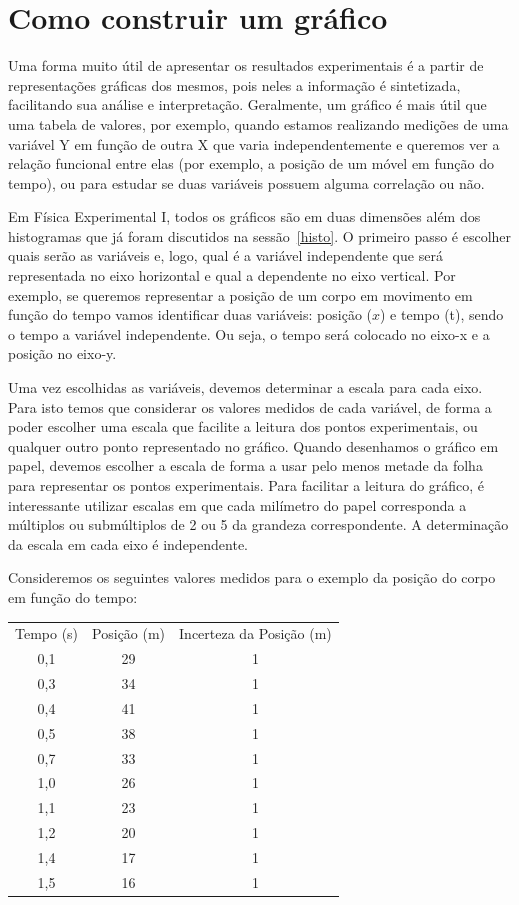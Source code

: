 \section{Como construir um gráfico}\label{plot}

Uma forma muito útil de apresentar os resultados experimentais é a partir de re\-pre\-sen\-ta\-ções gráficas dos mesmos, pois neles a informação é sintetizada, facilitando sua análise e interpretação. Geralmente, um gráfico é mais útil que uma tabela de valores, por exemplo, quando estamos realizando medições de uma variável Y em função de outra X que varia independentemente e queremos ver a relação funcional entre elas (por exemplo, a posição de um móvel em função do tempo), ou para estudar se duas variáveis possuem alguma correlação ou não.

Em Física Experimental I, todos os gráficos são em duas dimensões além dos histogramas que já foram discutidos na sessão~\ref{histo}. O primeiro passo é escolher quais serão as variáveis e, logo, qual é a variável independente que será representada no eixo horizontal e qual a dependente no eixo vertical.  Por exemplo, se queremos representar a posição de um corpo em movimento em função do tempo vamos identificar duas variáveis:  posição ($x$) e tempo (t), sendo o tempo a variável independente.  Ou seja, o tempo será colocado no eixo-x e a posição no eixo-y. 

Uma vez escolhidas as variáveis, devemos determinar a escala para cada eixo. Para isto temos que considerar os valores medidos de cada variável, de forma a poder escolher uma escala que facilite a leitura dos pontos experimentais, ou qualquer outro ponto representado no gráfico.  Quando desenhamos o gráfico em papel, devemos escolher a escala de forma a usar pelo menos metade da folha para representar os pontos experimentais. Para facilitar a leitura do gráfico, é interessante utilizar escalas em que cada milímetro do papel corresponda a múltiplos ou submúltiplos de 2 ou 5 da grandeza correspondente. A determinação da escala em cada eixo é independente.   

Consideremos os seguintes valores medidos para o exemplo da posição do corpo em função do tempo: %
\vspace{-0.7cm}
\begin{center}
  \begin{tabular}{|c|c|c|}
  Tempo (s) & Posição (m)  & Incerteza da Posição (m)	\\
0,1	&	29 & 1 \\
0,3	&	34 & 1 \\
0,4	&	41 & 1 \\
0,5	&	38 & 1 \\ 
0,7	&	33 & 1 \\ 
1,0	&	26 & 1 \\
1,1	&	23 & 1 \\
1,2	&	20 & 1 \\
1,4	&	17 & 1 \\
1,5	&	16 & 1 \\
\end{tabular}
\vspace{-0.4cm}
\end{center}

